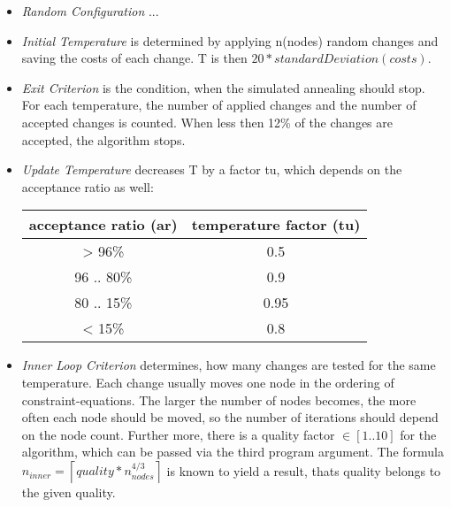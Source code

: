 \documentclass[colorback,accentcolor=tud1c,11pt]{tudreport}
\begin{document}
  \begin{itemize}
  	\item \emph{Random Configuration} ...
  	\item \emph{Initial Temperature} is determined by applying n(nodes) random changes and saving the costs of each change. T is then $20 * standardDeviation(costs)$.
  	\item \emph{Exit Criterion} is the condition, when the simulated annealing should stop. For each temperature, the number of applied changes and the number of accepted changes is counted. When less then 12\% of the changes are accepted, the algorithm stops.
  	\item \emph{Update Temperature} decreases T by a factor tu, which depends on the acceptance ratio as well:
  	\begin{tabular}{ c | c }
  		acceptance ratio (ar) & temperature factor (tu) \\
  		\hline
  		> 96\% & 0.5 \\
  		96 .. 80\% & 0.9 \\
  		80 .. 15\% & 0.95 \\
  		< 15\% & 0.8 \\
  	\end{tabular}
    \item \emph{Inner Loop Criterion} determines, how many changes are tested for the same temperature. Each change usually moves one node in the ordering of constraint-equations. The larger the number of nodes becomes, the more often each node should be moved, so the number of iterations should depend on the node count. Further more, there is a quality factor $\in [1 .. 10]$ for the algorithm, which can be passed via the third program argument. The formula $n_{inner} = \left\lceil quality * n_{nodes}^{4/3} \right\rceil$ is known to yield a result, thats quality belongs to the given quality.
  \end{itemize}



  
\end{document}
